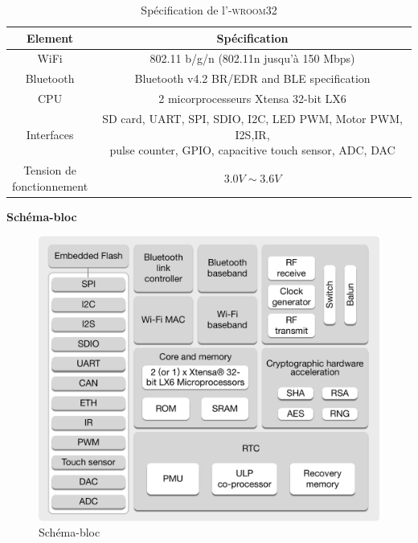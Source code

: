     \begin{table}[H]
        \centering
        \begin{tabular}{|c|c|}
            \hline
            \rowcolor{lightgray}
            Element & Spécification\\ \hline
            WiFi & 802.11 b/g/n (802.11n jusqu'à 150 Mbps)\\ \hline
            Bluetooth & Bluetooth v4.2 BR/EDR and BLE specification\\ \hline
            CPU & 2 micorprocesseurs Xtensa \up{\tiny{\textregistered}} 32-bit LX6\\ \hline
            Interfaces & \makecell{SD card, UART, SPI, SDIO, I2C, LED PWM, Motor PWM, I2S,IR, \\
                pulse counter, GPIO, capacitive touch sensor, ADC, DAC}\\ \hline
            \makecell{Tension de \\fonctionnement} & $3.0V \sim 3.6V$\\ \hline
        \end{tabular}
        \caption{Spécification de l'\esp\textsc{-wroom32} \cite{esp32-WROOM-32-datasheet}}
        \label{spec}
    \end{table}
    \textbf{Schéma-bloc}
    \begin{figure}[H]
        \centering
        \includegraphics[scale=0.15]{images/esp32-blockDiagram.png}
        \caption{Schéma-bloc \cite{esp32-datasheet}}
    \end{figure}

